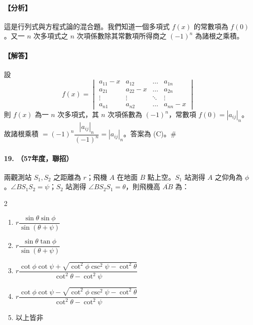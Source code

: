 \paragraph{【分析】}
這是行列式與方程式論的混合題。我們知道一個多項式 $f(x)$ 的常數項為 $f(0)$。又一 $n$ 次多項式之 $n$ 次項係數除其常數項所得商之 $(-1)^n$ 為諸根之乘積。

\paragraph{【解答】}
設
\[ f(x) = \begin{vmatrix}
a_{11}-x & a_{12} & \dots & a_{1n} \\
a_{21} & a_{22}-x & \dots & a_{2n} \\
\vdots & \vdots & \ddots & \vdots \\
a_{n1} & a_{n2} & \dots & a_{nn}-x
\end{vmatrix} \]
則 $f(x)$ 為一 $n$ 次多項式，其 $n$ 次項係數為 $(-1)^n$，常數項 $f(0) = |a_{ij}|_n$。故諸根乘積 $= (-1)^n \dfrac{|a_{ij}|_n}{(-1)^n} = |a_{ij}|_n$。答案為 (C)。\hfill$\#$

\paragraph{19. （57年度，聯招）}
兩觀測站 $S_1, S_2$ 之距離為 $r$；飛機 $A$ 在地面 $B$ 點上空。$S_1$ 站測得 $A$ 之仰角為 $\phi$。$\angle BS_1 S_2 = \psi$；$S_2$ 站測得 $\angle BS_2 S_1 = \theta$，則飛機高 $\overline{AB}$ 為：
\begin{multicols}{2}
\begin{enumerate}[label=\tiangan*]
  \item $r\dfrac{\sin\theta\sin\phi}{\sin(\theta+\psi)}$
  \item $r\dfrac{\sin\theta\tan\phi}{\sin(\theta+\psi)}$
  \item $r\dfrac{\cot\phi\cot\psi+\sqrt{\cot^2\phi\csc^2\psi-\cot^2\theta}}{\cot^2\theta-\cot^2\psi}$
  \item $r\dfrac{\cot\phi\cot\psi-\sqrt{\cot^2\phi\csc^2\psi-\cot^2\theta}}{\cot^2\theta-\cot^2\psi}$
  \item 以上皆非
\end{enumerate}
\end{multicols}

